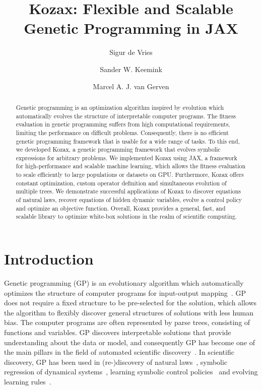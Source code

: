 \documentclass{article}
\title{Kozax: Flexible and Scalable Genetic Programming in JAX}
\author[1*]{Sigur de Vries}
\author[1]{Sander W. Keemink}
\author[1]{Marcel A. J. van Gerven}
\date{}
\affil[1]{Department of Machine Learning and Neural Computing, Donders Institute for Brain, Cognition and Behaviour, Radboud University,  Nijmegen, the Netherlands}
\affil[*] {sigur.devries@ru.nl}
\begin{document}
\maketitle

\begin{abstract}
  Genetic programming is an optimization algorithm inspired by evolution which automatically evolves the structure of interpretable computer programs. The fitness evaluation in genetic programming suffers from high computational requirements, limiting the performance on difficult problems. Consequently, there is no efficient genetic programming framework that is usable for a wide range of tasks. To this end, we developed Kozax, a genetic programming framework that evolves symbolic expressions for arbitrary problems. We implemented Kozax using JAX, a framework for high-performance and scalable machine learning, which allows the fitness evaluation to scale efficiently to large populations or datasets on GPU. Furthermore, Kozax offers constant optimization, custom operator definition and simultaneous evolution of multiple trees. We demonstrate successful applications of Kozax to discover equations of natural laws, recover equations of hidden dynamic variables, evolve a control policy and optimize an objective function. Overall, Kozax provides a general, fast, and scalable library to optimize white-box solutions in the realm of scientific computing.
\end{abstract}

\section{Introduction}
Genetic programming (GP) is an evolutionary algorithm which automatically optimizes the structure of computer programs for input-output mapping~\cite{koza1994genetic}. GP does not require a fixed structure to be pre-selected for the solution, which allows the algorithm to flexibly discover general structures of solutions with less human bias. The computer programs are often represented by parse trees, consisting of functions and variables. GP discovers interpretable solutions that provide understanding about the data or model, and consequently GP has become one of the main pillars in the field of automated scientific discovery~\cite{wang2023scientific, bongard2007automated}. In scientific discovery, GP has been used in (re-)discovery of natural laws~\cite{schmidt2009distilling, la2021contemporary}, symbolic regression of dynamical systems~\cite{bongard2007automated, cao2000evolutionary}, learning symbolic control policies~\cite{hein2018interpretable,vries2024discovering,nadizar2024naturally} and evolving learning rules~\cite{jordan2021evolving, bengio1994use}.
\end{document}
